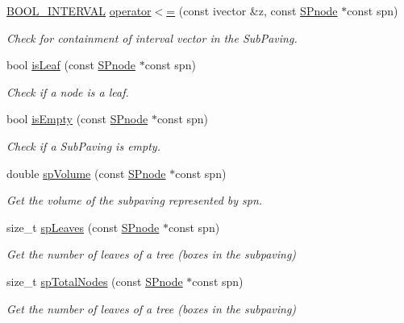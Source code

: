 \begin{DoxyCompactItemize}
\hyperlink{namespacesubpavings_abf44b15764c504d6ffa87c62b45b01a6}{\-B\-O\-O\-L\-\_\-\-I\-N\-T\-E\-R\-V\-A\-L} \hyperlink{namespacesubpavings_aca1892906e63d34720305016dd41156d}{operator$<$=} (const ivector \&z, const \hyperlink{classsubpavings_1_1SPnode}{\-S\-Pnode} $\ast$const spn)
\begin{DoxyCompactList}\small\item\em \-Check for containment of interval vector in the \-Sub\-Paving. \end{DoxyCompactList}\item 
bool \hyperlink{namespacesubpavings_a6ce5e0d7ef8daa51a49872efc2ef56d8}{is\-Leaf} (const \hyperlink{classsubpavings_1_1SPnode}{\-S\-Pnode} $\ast$const spn)
\begin{DoxyCompactList}\small\item\em \-Check if a node is a leaf. \end{DoxyCompactList}\item 
bool \hyperlink{namespacesubpavings_a72386487753f5334a70250b068f97f15}{is\-Empty} (const \hyperlink{classsubpavings_1_1SPnode}{\-S\-Pnode} $\ast$const spn)
\begin{DoxyCompactList}\small\item\em \-Check if a \-Sub\-Paving is empty. \end{DoxyCompactList}\item 
double \hyperlink{namespacesubpavings_a8bfd50d3105ff4944ae6e42e0138ffb6}{sp\-Volume} (const \hyperlink{classsubpavings_1_1SPnode}{\-S\-Pnode} $\ast$const spn)
\begin{DoxyCompactList}\small\item\em \-Get the volume of the subpaving represented by spn. \end{DoxyCompactList}\item 
size\-\_\-t \hyperlink{namespacesubpavings_acd777346441d8790899ec09af3b11d61}{sp\-Leaves} (const \hyperlink{classsubpavings_1_1SPnode}{\-S\-Pnode} $\ast$const spn)
\begin{DoxyCompactList}\small\item\em \-Get the number of leaves of a tree (boxes in the subpaving) \end{DoxyCompactList}\item 
size\-\_\-t \hyperlink{namespacesubpavings_aa737c3b183c306abbef9b3d515f632fb}{sp\-Total\-Nodes} (const \hyperlink{classsubpavings_1_1SPnode}{\-S\-Pnode} $\ast$const spn)
\begin{DoxyCompactList}\small\item\em \-Get the number of leaves of a tree (boxes in the subpaving) \end{DoxyCompactList}\item 

\end{DoxyCompactItemize}
